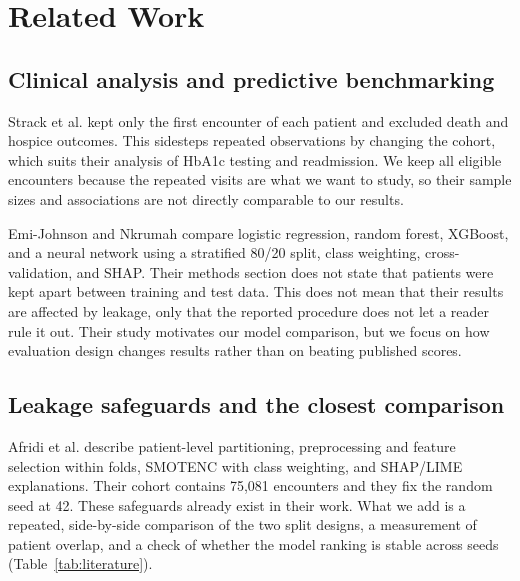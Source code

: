 \documentclass[conference]{IEEEtran}
\begin{document}
\section{Related Work}
\subsection{Clinical analysis and predictive benchmarking}
Strack et al. \cite{strack} kept only the first encounter of each patient and excluded death and hospice outcomes. This sidesteps repeated observations by changing the cohort, which suits their analysis of HbA1c testing and readmission. We keep all eligible encounters because the repeated visits are what we want to study, so their sample sizes and associations are not directly comparable to our results.

Emi-Johnson and Nkrumah \cite{emi} compare logistic regression, random forest, XGBoost, and a neural network using a stratified 80/20 split, class weighting, cross-validation, and SHAP. Their methods section does not state that patients were kept apart between training and test data. This does not mean that their results are affected by leakage, only that the reported procedure does not let a reader rule it out. Their study motivates our model comparison, but we focus on how evaluation design changes results rather than on beating published scores.

\subsection{Leakage safeguards and the closest comparison}
Afridi et al. \cite{afridi} describe patient-level partitioning, preprocessing and feature selection within folds, SMOTENC with class weighting, and SHAP/LIME explanations. Their cohort contains 75,081 encounters and they fix the random seed at 42. These safeguards already exist in their work. What we add is a repeated, side-by-side comparison of the two split designs, a measurement of patient overlap, and a check of whether the model ranking is stable across seeds (Table~\ref{tab:literature}).
\end{document}
